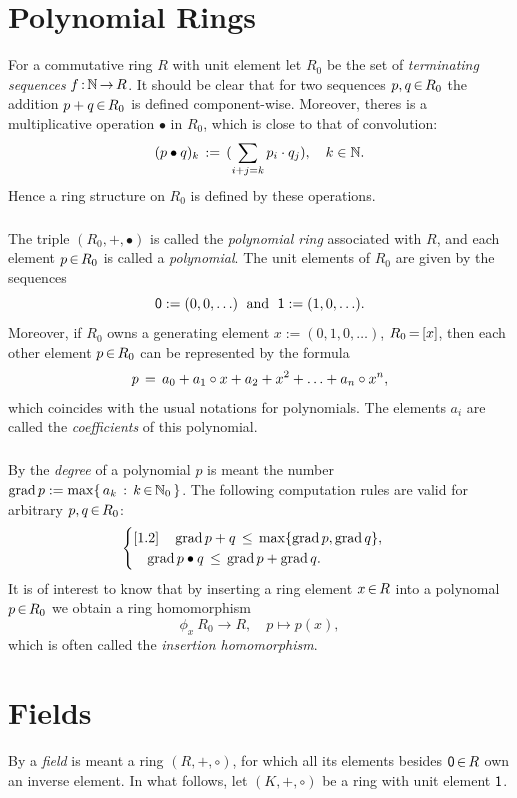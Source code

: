 \documentclass[11pt,twoside]{article}
\begin{document}
\section{Polynomial Rings}
For a commutative ring $R$ with unit element
let $R_0$ be the set of \textit{terminating sequences} $f \: \N \xto R$.
It should be clear
that for two sequences $p,q \xeof R_0$ the addition
$p + q \xeof R_0$ is defined component-wise.
Moreover,
theres is a multiplicative operation $\bullet$ in $R_0$,
which is close to that of convolution:
\[
(p \bullet q)_k \eqdef (\sum_{i+j=k} p_i \cdot q_j), \quad k \in \N.
\]
Hence a ring structure on $R_0$ is defined by these operations.

\subparagraph{}
The triple $(R_0,+,\bullet)$ is called the \textit{polynomial ring}
associated with $R$,
and each element $p \xeof R_0$ is called a \textit{polynomial}.
The unit elements of $R_0$ are given by the sequences
\[
\0 : = (0,0,\ldots) \; \and \; \1 := (1,0,\ldots).
\]
Moreover,
if $R_0$ owns a generating element $x := (0,1,0,\ldots)$,
{\ie} $R_0 \eq [x]$, 
then each other element $p \xeof R_0$ can be represented by the formula
\[
p \= a_0 + a_1 \circ x + a_2 + x^2 + \ldots + a_n \circ x^n,
\]
which coincides with the usual notations for polynomials.
The elements $a_i$ are called the \textit{coefficients} of this polynomial.

\subparagraph{}
By the \textit{degree} of a polynomial $p$ is meant the number
$\grad{p} := \max \set{a_k}{k \xeof \N_0}$.
The following computation rules are valid for arbitrary $p,q \xeof R_0$:
\[
\begin{cases}[1.2]
\quad \grad{p+q}         \, \leq \, \max \{ \grad{p}, \grad{q} \},\\
\quad \grad{p \bullet q} \, \leq \, \grad{p} + \grad{q}.\\
\end{cases}
\]
It is of interest to know
that by inserting a ring element $x \xeof R$ into a polynomal $p \xeof R_0$
we obtain a ring homomorphism
\[
\phi_x \: R_0 \to R, \quad p \mapsto p(x),
\]
which is often called the \textit{insertion homomorphism}.

\section{Fields}  
By a \textit{field} is meant a ring $(R,+,\circ)$,
for which all its elements besides $\0 \xeof R$ own an inverse element.
In what follows,
let $(K,+,\circ)$ be a ring with unit element $\1$.
\end{document}
